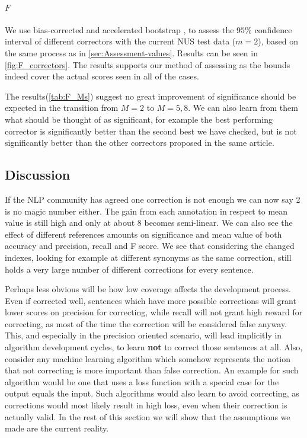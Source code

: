 \documentclass[english]{article}
\begin{document}
\paragraph{$F$}We use bias-corrected and accelerated bootstrap \cite{efron1987better}, to assess the $95\%$ confidence interval of different correctors with the current NUS test data ($m=2$), based on the same process as in \ref{sec:Assessment-values}. Results can be seen in \ref{fig:F_correctors}. The results supports our method of assessing as the bounds indeed cover the actual scores seen in all of the cases.

The results(\ref{tab:F_Ms}) suggest no great improvement of significance should be expected in the transition from $M=2$ to $M=5,8$. We can also learn from them what should be thought of as significant, for example the best performing corrector is significantly better than the second best we have checked, but is not significantly better than the other correctors proposed in the same article\cite{rozovskaya2016grammatical}.

\subsection{Discussion}

If the NLP community has agreed one correction is not enough\cite{tetreault2008native}
we can now say 2 is no magic number either. The gain from each annotation in respect to mean value is still high and only at about 8 becomes semi-linear. We can also see the effect of different references amounts on significance and mean value of both accuracy and precision, recall and F score.
We see that considering the changed indexes, looking for example at different synonyms as the same correction, still holds a very large number of different corrections for every sentence.

Perhaps less obvious will be how low coverage affects the development
process. Even if corrected well, sentences which have more possible
corrections will grant lower scores on precision for correcting, while recall will not grant high reward for correcting, as most of the time the correction will be considered false anyway. This, and especially in the precision oriented scenario, will lead implicitly in algorithm development cycles, to learn \textbf{not} to correct those sentences at all. Also, consider any machine learning algorithm which somehow represents the notion that not correcting is more important than false correction. An example for such algorithm would be one that uses a loss function with a special case for the output equals the input. Such algorithms would also learn to avoid correcting, as corrections would most likely result in high loss, even when their correction is actually valid.
In the rest of this section we will show that the assumptions we made are the current reality. 
\end{document}
